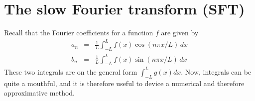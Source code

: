 


   

%



\section{The slow Fourier transform (SFT)} \label{appendix:fourier}
Recall that the Fourier coefficients for a function $f$ are given by
\begin{eqnarray}
  a_n &=& \frac{1}{L}\int_{-L}^L f(x) \cos(n\pi x/L) \, dx \\
  b_n &=& \frac{1}{L}\int_{-L}^L f(x) \sin(n\pi x/L) \, dx 
\end{eqnarray}
These two integrals are on the general form
$\int_{-L}^L g(x) dx$. Now, integrals can be quite a mouthful, and
it is therefore useful to device a numerical and therefore approximative method.

